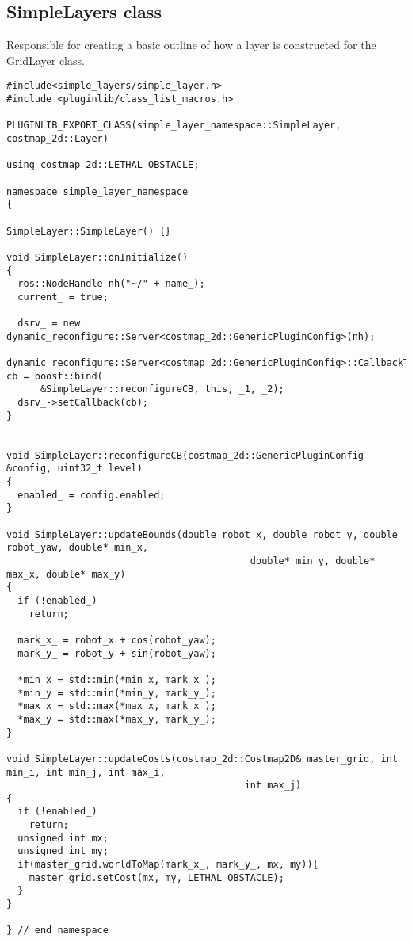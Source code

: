 \subsection{SimpleLayers class}
Responsible for creating a basic outline of how a layer is constructed for the GridLayer class.
\begin{lstlisting}
#include<simple_layers/simple_layer.h>
#include <pluginlib/class_list_macros.h>

PLUGINLIB_EXPORT_CLASS(simple_layer_namespace::SimpleLayer, costmap_2d::Layer)

using costmap_2d::LETHAL_OBSTACLE;

namespace simple_layer_namespace
{

SimpleLayer::SimpleLayer() {}

void SimpleLayer::onInitialize()
{
  ros::NodeHandle nh("~/" + name_);
  current_ = true;

  dsrv_ = new dynamic_reconfigure::Server<costmap_2d::GenericPluginConfig>(nh);
  dynamic_reconfigure::Server<costmap_2d::GenericPluginConfig>::CallbackType cb = boost::bind(
      &SimpleLayer::reconfigureCB, this, _1, _2);
  dsrv_->setCallback(cb);
}


void SimpleLayer::reconfigureCB(costmap_2d::GenericPluginConfig &config, uint32_t level)
{
  enabled_ = config.enabled;
}

void SimpleLayer::updateBounds(double robot_x, double robot_y, double robot_yaw, double* min_x,
                                           double* min_y, double* max_x, double* max_y)
{
  if (!enabled_)
    return;

  mark_x_ = robot_x + cos(robot_yaw);
  mark_y_ = robot_y + sin(robot_yaw);

  *min_x = std::min(*min_x, mark_x_);
  *min_y = std::min(*min_y, mark_y_);
  *max_x = std::max(*max_x, mark_x_);
  *max_y = std::max(*max_y, mark_y_);
}

void SimpleLayer::updateCosts(costmap_2d::Costmap2D& master_grid, int min_i, int min_j, int max_i,
                                          int max_j)
{
  if (!enabled_)
    return;
  unsigned int mx;
  unsigned int my;
  if(master_grid.worldToMap(mark_x_, mark_y_, mx, my)){
    master_grid.setCost(mx, my, LETHAL_OBSTACLE);
  }
}

} // end namespace

\end{lstlisting}

